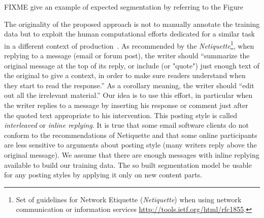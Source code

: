 FIXME give an example of expected segmentation by referring to the Figure 

The originality of the proposed approach is not to manually annotate the training data but to exploit the human computational efforts dedicated for a similar task in a different context of production~\cite{ahn:2006:computer}. 
% 
As recommended by the \textit{Netiquette}\footnote{Set of guidelines for Network Etiquette (\textit{Netiquette}) when using network communication or information services \url{http://tools.ietf.org/html/rfc1855}.}, when replying to a message (email or forum post), the writer should 
 ``summarize the original message at the top of its reply, %
or include (or "quote") just enough text of the original to give a context, in order to make sure readers understand when they start to read the response.''  As a corollary meaning, the writer should ``edit out all the irrelevant material.''
%
Our idea is to use this effort, in particular when the writer replies to a message by inserting his response or comment just after the quoted text appropriate to his intervention. 
%
This posting style is called \textit{interleaved} or \textit{inline replying}.
%
It is true that some email software clients do not conform to the recommendations of Netiquette and that some online participants are less sensitive to arguments about posting style (many writers reply above  the original message).
We assume that there are enough messages with inline replying available to build our training data. 
The so built segmentation model be usable for any posting styles by applying it only on new content parts.


